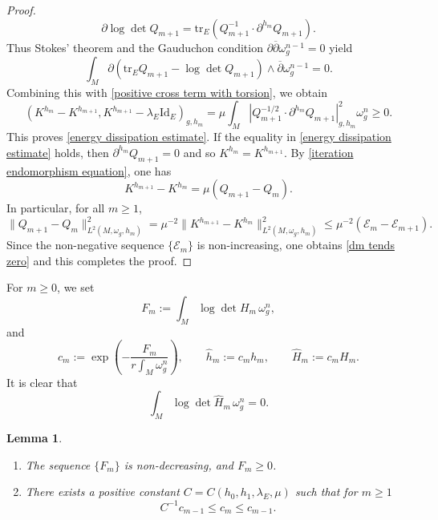 \documentclass[12pt, reqno]{amsart}
\newcommand\cE{{\mathcal E}}
\newcommand{\id}{\mathrm{Id}}
\theoremstyle{plain}
\newtheorem{lemma}[thm]{Lemma}
\theoremstyle{definition}
\newcommand{\blemma}{\begin{lemma}}
\newcommand{\elemma}{\end{lemma}}
\renewcommand{\bar}{\overline}
\newcommand{\beq}{\begin{equation}}
\newcommand{\eeq}{\end{equation}}
\newcommand{\bd}{\begin{enumerate}}
\newcommand{\ed}{\end{enumerate}}
\renewcommand{\hat}{\widehat}
\renewcommand{\>}{\rightarrow}
\newcommand{\om}{\omega}
\newcommand{\tr}{\mathrm{tr}}
\numberwithin{equation}{section}
\begin{document}
\begin{proof}
	\[
	\partial\log\det Q_{m+1}
	=\tr_E\left(Q_{m+1}^{-1}\cdot\partial^{h_m}Q_{m+1}\right).
	\]
	Thus Stokes' theorem and the Gauduchon condition
	$\partial\bar\partial\omega_g^{n-1}=0$  yield
	\[
	\int_M
	\partial\left(\tr_E Q_{m+1}-\log\det Q_{m+1}\right)
	\wedge\bar\partial\omega_g^{n-1}=0.
	\]
	Combining this with \eqref{positive cross term with torsion}, we obtain
	\beq
	\left(K^{h_m}-K^{h_{m+1}},
	K^{h_{m+1}}-\lambda_E\id_E\right)_{g,h_m}
	=\mu\int_M
	\left|Q_{m+1}^{-1/2}\cdot\partial^{h_m}Q_{m+1}
	\right|_{g,h_m}^2\omega_g^n\geq0.
	\label{positive cross term}
	\eeq
	This proves \eqref{energy dissipation estimate}. If the  equality in \eqref{energy dissipation estimate} holds, then $\partial^{h_m}Q_{m+1}=0$ and so  $K^{h_m}=K^{h_{m+1}}$.  By \eqref{iteration endomorphism equation}, one has
	\beq 
	K^{h_{m+1}}-K^{h_m}=\mu(Q_{m+1}-Q_m).
	\eeq
	In particular, for all $m\geq 1$,
	\beq \|Q_{m+1}-Q_m\|^2_{L^2(M,\om_g,h_m)}=\mu^{-2} \|K^{h_{m+1}}-K^{h_m}\|^2_{L^2(M,\om_g,h_m)}\leq \mu^{-2}\left( \cE_m-\cE_{m+1}\right).\eeq 
	Since the non-negative sequence $\{\cE_m\}$ is non-increasing,  one obtains \eqref{dm tends zero} and this completes the proof.
\end{proof}


\noindent 
For $m\geq 0$, we set 
\begin{equation}
F_m:=\int_M\log\det H_m\,\omega_g^n,
\label{Fm definition}
\end{equation}
and 
\begin{equation}
c_m:=\exp\left(-\frac{F_m}{r\int_M\om_g^n}\right),
\qquad
\hat h_m:=c_mh_m,
\qquad
\hat H_m:=c_mH_m.
\label{normalization definition}
\end{equation}
It is clear that 
\begin{equation}
\int_M\log\det\hat H_m\,\omega_g^n=0.
\label{normalized determinant mean}
\end{equation}
\blemma\label{Fm monotonicity lemma}
\bd
\item The sequence $\{F_m\}$ is non-decreasing, and $F_m\geq0$.
\item There exists a positive constant $C=C(h_0,h_1,\lambda_E,\mu)$ such that for $m\geq 1$
\beq
C^{-1}c_{m-1}\leq c_m\leq c_{m-1}.
\eeq
\ed
\elemma
\end{document}

